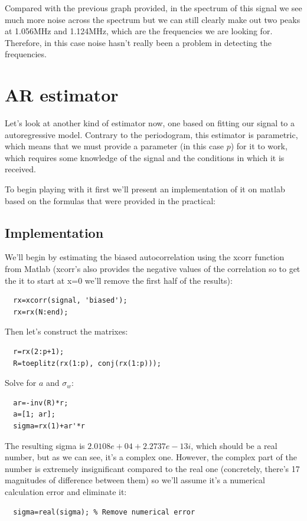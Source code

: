\documentclass[conference,9pt]{IEEEtran}
\begin{document}
Compared with the previous graph provided, in the spectrum of this signal we see much more noise across the spectrum but we can still clearly make out two peaks at 1.056MHz and 1.124MHz, which are the frequencies we are looking for. Therefore, in this case noise hasn't really been a problem in detecting the frequencies.

\section{AR estimator}
Let's look at another kind of estimator now, one based on fitting our signal to a autoregressive model. Contrary to the periodogram, this estimator is parametric, which means that we must provide a parameter (in this case $p$) for it to work, which requires some knowledge of the signal and the conditions in which it is received.

To begin playing with it first we'll present an implementation of it on matlab based on the formulas that were provided in the practical:

\subsection{Implementation}
We'll begin by estimating the biased autocorrelation using the xcorr function from Matlab (xcorr's also provides the negative values of the correlation so to get the it to start at x=0 we'll remove the first half of the results):
\begin{verbatim}
  rx=xcorr(signal, 'biased');
  rx=rx(N:end);
\end{verbatim}

Then let's construct the matrixes:
\begin{verbatim}
  r=rx(2:p+1);
  R=toeplitz(rx(1:p), conj(rx(1:p)));
\end{verbatim}

Solve for $a$ and $\sigma_w$:
\begin{verbatim}
  ar=-inv(R)*r;
  a=[1; ar];
  sigma=rx(1)+ar'*r
\end{verbatim}

The resulting sigma is $2.0108e+04 + 2.2737e-13i$, which should be a real number, but as we can see, it's a complex one. However, the complex part of the number is extremely insignificant compared to the real one (concretely, there's 17 magnitudes of difference between them) so we'll assume it's a numerical calculation error and eliminate it:
\begin{verbatim}
  sigma=real(sigma); % Remove numerical error
\end{verbatim}
\end{document}
